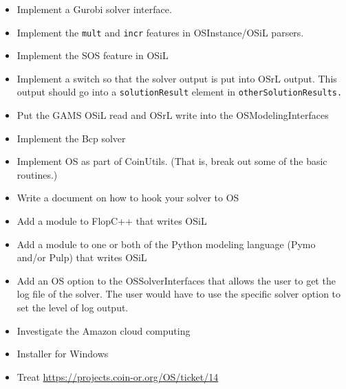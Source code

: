 %
%

\begin{itemize}
\item Implement a Gurobi solver interface.

\item Implement the {\tt mult} and {\tt incr} features in OSInstance/OSiL parsers.

\item Implement the SOS feature in OSiL

\item Implement a switch so that the solver output is put into OSrL output. This output should go into a {\tt solutionResult} element in {\tt otherSolutionResults.}

\item Put the GAMS OSiL read and OSrL write into the OSModelingInterfaces

\item Implement the Bcp solver

\item Implement OS as part of CoinUtils. (That is, break out some of the basic routines.)

\item Write a document on how to hook your solver to OS

\item Add a module to FlopC++ that writes OSiL

\item Add a module to one or both of the Python modeling language (Pymo and/or Pulp) that writes OSiL

\item Add an OS option to the OSSolverInterfaces that allows the user to get the log file of the solver. The user would have to use the specific solver option to set the level of log output.

\item Investigate the Amazon cloud computing

\item Installer for Windows

\item Treat \url{https://projects.coin-or.org/OS/ticket/14} 


\end{itemize}
